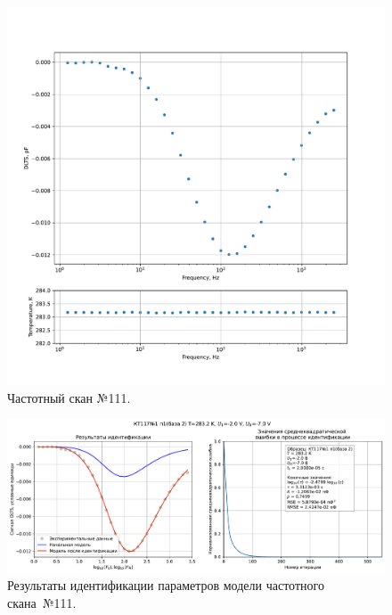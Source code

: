\begin{figure}[!ht]
    \centering
    \includegraphics[width=1\textwidth]{../plots/КТ117№1_п1(база 2)_2500Гц-1Гц_1пФ_+10С_-2В-7В_200мВ_20мкс_шаг_0,1.pdf}
    \caption{Частотный скан №111.}
    \label{pic:frequency_scan_111}
\end{figure}

\begin{figure}[!ht]
    \centering
    \includegraphics[width=1\textwidth]{../plots/КТ117№1_п1(база 2)_2500Гц-1Гц_1пФ_+10С_-2В-7В_200мВ_20мкс_шаг_0,1_model.pdf}
    \caption{Результаты идентификации параметров модели частотного скана~№111.}
    \label{pic:frequency_scan_model111}
\end{figure}

\pagebreak



